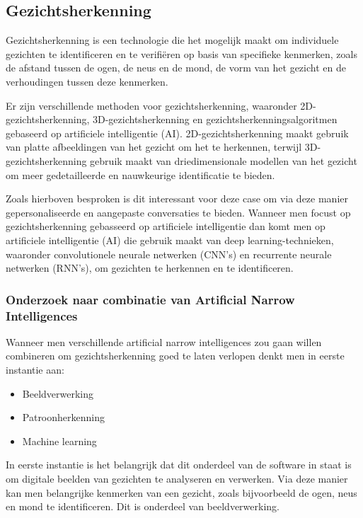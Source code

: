 \subsection{Gezichtsherkenning}

Gezichtsherkenning is een technologie die het mogelijk maakt om individuele gezichten te identificeren en te verifiëren op basis van specifieke kenmerken, zoals de afstand tussen de ogen, de neus en de mond, de vorm van het gezicht en de verhoudingen tussen deze kenmerken.

Er zijn verschillende methoden voor gezichtsherkenning, waaronder 2D-gezichtsherkenning, 3D-gezichtsherkenning en gezichtsherkenningsalgoritmen gebaseerd op artificiele intelligentie (AI). 2D-gezichtsherkenning maakt gebruik van platte afbeeldingen van het gezicht om het te herkennen, terwijl 3D-gezichtsherkenning gebruik maakt van driedimensionale modellen van het gezicht om meer gedetailleerde en nauwkeurige identificatie te bieden.

Zoals hierboven besproken is dit interessant voor deze case om via deze manier gepersonaliseerde en aangepaste conversaties te bieden. Wanneer men focust op gezichtsherkenning gebasseerd op artificiele intelligentie dan komt men op  artificiele intelligentie (AI) die gebruik maakt van deep learning-technieken, waaronder convolutionele neurale netwerken (CNN's) en recurrente neurale netwerken (RNN's), om gezichten te herkennen en te identificeren.

\subsubsection{Onderzoek naar combinatie van Artificial Narrow Intelligences}

Wanneer men verschillende artificial narrow intelligences zou gaan willen combineren om gezichtsherkenning goed te laten verlopen denkt men in eerste instantie aan:

\begin{itemize}
    \item Beeldverwerking
    \item Patroonherkenning
    \item Machine learning
\end{itemize}

In eerste instantie is het belangrijk dat dit onderdeel van de software in staat is om digitale beelden van gezichten te analyseren en verwerken. Via deze manier kan men belangrijke kenmerken van een gezicht, zoals bijvoorbeeld de ogen, neus en mond te identificeren. Dit is onderdeel van beeldverwerking.

